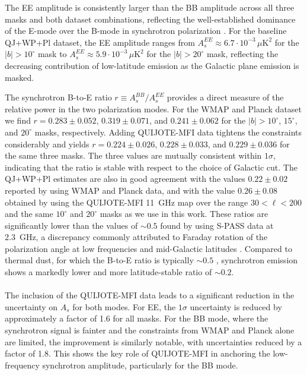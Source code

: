 The EE amplitude is consistently larger than the BB amplitude across all three masks and both dataset combinations, reflecting the well-established dominance of the E-mode over the B-mode in synchrotron polarization \citep{Krachmalnicoff_2018, Martire_2022}. For the baseline QJ+WP+Pl dataset, the EE amplitude ranges from $A_s^{EE} \approx 6.7 \cdot 10^{-3}\,\mu\mathrm{K}^2$ for the $|b| > 10^\circ$ mask to $A_s^{EE} \approx 5.9 \cdot 10^{-3}\,\mu\mathrm{K}^2$ for the $|b| > 20^\circ$ mask, reflecting the decreasing contribution of low-latitude emission as the Galactic plane emission is masked. 

The synchrotron B-to-E ratio $r \equiv A_s^{BB}/A_s^{EE}$ provides a direct measure of the relative power in the two polarization modes. For the WMAP and Planck dataset we find $r = 0.283 \pm 0.052$, $0.319 \pm 0.071$, and $0.241 \pm 0.062$ for the $|b| > 10^\circ$, $15^\circ$, and $20^\circ$ masks, respectively. Adding QUIJOTE-MFI data tightens the constraints considerably and yields $r = 0.224 \pm 0.026$, $0.228 \pm 0.033$, and $0.229 \pm 0.036$ for the same three masks. The three values are mutually consistent within $1\sigma$, indicating that the ratio is stable with respect to the choice of Galactic cut. The QJ+WP+Pl estimates are also in good agreement with the values $0.22 \pm 0.02$ reported by \citet{Martire_2022} using WMAP and Planck data, and with the value $0.26 \pm 0.08$ obtained by \citet{QUIJOTE_IV} using the QUIJOTE-MFI 11~GHz map over the range $30 < \ell < 200$ and the same $10^\circ$ and $20^\circ$ masks as we use in this work. These ratios are significantly lower than the values of $\sim 0.5$ found by \citet{Krachmalnicoff_2018} using S-PASS data at 2.3~GHz, a discrepancy commonly attributed to Faraday rotation of the polarization angle at low frequencies and mid-Galactic latitudes \citep{Fuskeland_2021}. Compared to thermal dust, for which the B-to-E ratio is typically $\sim 0.5$ \citep{Planck_2018XI}, synchrotron emission shows a markedly lower and more latitude-stable ratio of $\sim 0.2$.

\paragraph{}

The inclusion of the QUIJOTE-MFI data leads to a significant reduction in the uncertainty on $A_s$ for both modes. For EE, the $1\sigma$ uncertainty is reduced by approximately a factor of 1.6 for all masks. For the BB mode, where the synchrotron signal is fainter and the constraints from WMAP and Planck alone are limited, the improvement is similarly notable, with uncertainties reduced by a factor of 1.8. This shows the key role of QUIJOTE-MFI in anchoring the low-frequency synchrotron amplitude, particularly for the BB mode.

